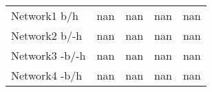 \begin{table*}[h]
\begin{minipage}[h]{0.45\linewidth}
\begin{tabular}{lrrrr}
 Network1 b/h        &      nan &         nan &      nan &   nan \\
 Network2 b/-h     &      nan &         nan &      nan &   nan \\
 Network3 -b/-h    &      nan &         nan &      nan &   nan \\
 Network4 -b/h      &      nan &         nan &      nan &   nan \\
\hline
\end{tabular}
\end{minipage}
\end{table*}






